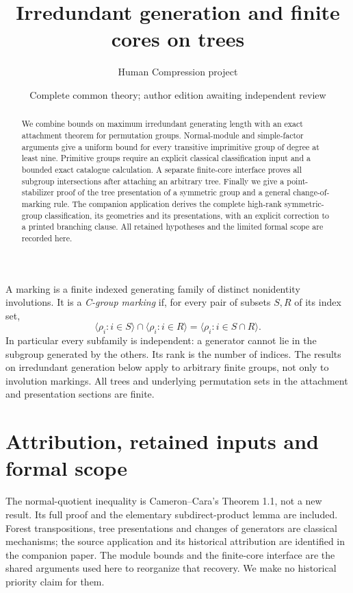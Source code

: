 
\title{Irredundant generation and finite cores on trees}
\author{Human Compression project}
\date{Complete common theory; author edition awaiting independent review}
\maketitle
\begin{abstract}
We combine bounds on maximum irredundant generating length with an
exact attachment theorem for permutation groups. Normal-module and
simple-factor arguments give a uniform bound for every transitive
imprimitive group of degree at least nine. Primitive groups require an
explicit classical classification input and a bounded exact catalogue
calculation. A separate finite-core interface proves all subgroup
intersections after attaching an arbitrary tree. Finally we give a
point-stabilizer proof of the tree presentation of a symmetric group
and a general change-of-marking rule. The companion application derives
the complete high-rank symmetric-group classification, its geometries
and its presentations, with an explicit correction to a printed
branching clause. All retained hypotheses and the limited formal scope
are recorded here.
\end{abstract}

A marking is a finite indexed generating family of distinct nonidentity
involutions. It is a \emph{C-group marking} if, for every pair of subsets
$S,R$ of its index set,
\[
 \langle\rho_i:i\in S\rangle\cap\langle\rho_i:i\in R\rangle
 =\langle\rho_i:i\in S\cap R\rangle.
\]
In particular every subfamily is independent: a generator cannot lie
in the subgroup generated by the others. Its rank is the number of
indices. The results on irredundant generation below apply to arbitrary
finite groups, not only to involution markings. All trees and underlying
permutation sets in the attachment and presentation sections are finite.





\section{Attribution, retained inputs and formal scope}
The normal-quotient inequality is Cameron--Cara's Theorem 1.1, not a
new result. Its full proof and the elementary subdirect-product lemma
are included. Forest transpositions, tree presentations and changes of
generators are classical mechanisms; the source application and its
historical attribution are identified in the companion paper. The
module bounds and the finite-core interface are the shared arguments
used here to reorganize that recovery. We make no historical priority
claim for them.

